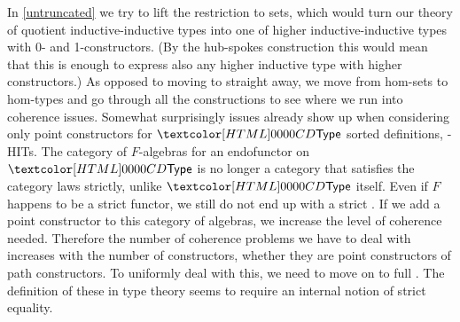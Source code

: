 In \cref{untruncated} we try to lift the restriction to sets, which
would turn our theory of quotient inductive-inductive types into one
of higher inductive-inductive types with 0- and 1-constructors. (By
the hub-spokes construction this would mean that this is enough to
express also any higher inductive type with higher constructors.) As
opposed to moving to \inftycats straight away, we move from hom-sets
to hom-types and go through all the constructions to see where we run
into coherence issues. Somewhat surprisingly issues already show up
when considering only point constructors for $\Type$ sorted
definitions, -HITs. The category of $F$-algebras for an
endofunctor on $\Type$ is no longer a category that satisfies the
category laws strictly, unlike $\Type$ itself. Even if $F$ happens to
be a strict functor, we still do not end up with a strict
\inftycat. If we add a point constructor to this category of algebras,
we increase the level of coherence needed. Therefore the number of
coherence problems we have to deal with increases with the number of
constructors, whether they are point constructors of path
constructors. To uniformly deal with this, we need to move on to full
\inftycats. The definition of these in type theory seems to require an
internal notion of strict equality.





